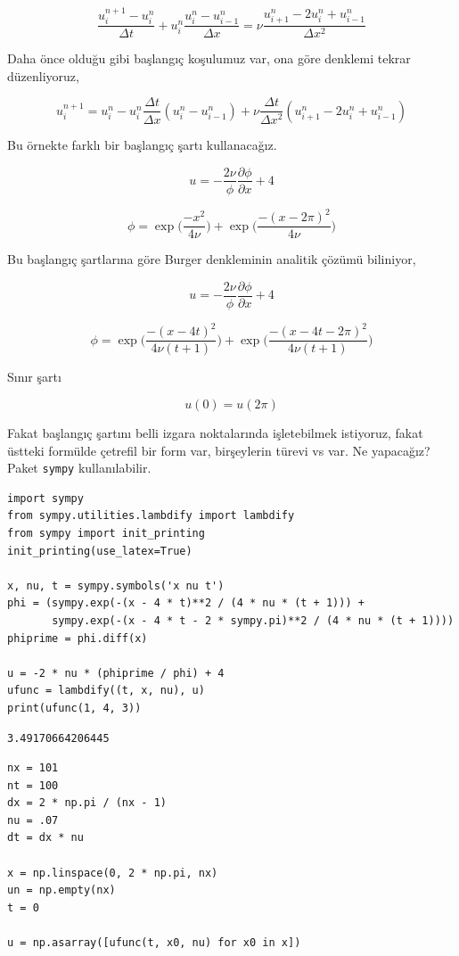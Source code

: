 \documentclass[12pt,fleqn]{article}\usepackage{../../common}
\begin{document}
$$
\frac{u_i^{n+1}-u_i^n}{\Delta t} + u_i^n \frac{u_i^n - u_{i-1}^n}{\Delta x} =
\nu \frac{u_{i+1}^n - 2u_i^n + u_{i-1}^n}{\Delta x^2}
$$

Daha önce olduğu gibi başlangıç koşulumuz var, ona göre denklemi tekrar
düzenliyoruz,

$$
u_i^{n+1} =
u_i^n - u_i^n \frac{\Delta t}{\Delta x} (u_i^n - u_{i-1}^n) +
\nu \frac{\Delta t}{\Delta x^2}(u_{i+1}^n - 2u_i^n + u_{i-1}^n)
$$

Bu örnekte farklı bir başlangıç şartı kullanacağız.

$$
u = -\frac{2 \nu}{\phi} \frac{\partial \phi}{\partial x} + 4 
$$

$$
\phi = \exp \bigg(\frac{-x^2}{4 \nu} \bigg) + \exp \bigg(\frac{-(x-2 \pi)^2}{4 \nu} \bigg)
$$

Bu başlangıç şartlarına göre Burger denkleminin analitik çözümü biliniyor,

$$
u = -\frac{2 \nu}{\phi} \frac{\partial \phi}{\partial x} + 4
$$

$$
\phi = \exp \bigg(\frac{-(x-4t)^2}{4 \nu (t+1)} \bigg) + \exp \bigg(\frac{-(x-4t -2 \pi)^2}{4 \nu(t+1)} \bigg)
$$

Sınır şartı

$$
u(0) = u(2\pi)
$$

Fakat başlangıç şartını belli izgara noktalarında işletebilmek istiyoruz, fakat
üstteki formülde çetrefil bir form var, birşeylerin türevi vs var. Ne yapacağız? 
Paket \verb!sympy! kullanılabilir.

\begin{verbatim}
import sympy
from sympy.utilities.lambdify import lambdify
from sympy import init_printing
init_printing(use_latex=True)

x, nu, t = sympy.symbols('x nu t')
phi = (sympy.exp(-(x - 4 * t)**2 / (4 * nu * (t + 1))) +
       sympy.exp(-(x - 4 * t - 2 * sympy.pi)**2 / (4 * nu * (t + 1))))
phiprime = phi.diff(x)

u = -2 * nu * (phiprime / phi) + 4
ufunc = lambdify((t, x, nu), u)
print(ufunc(1, 4, 3))
\end{verbatim}

\begin{verbatim}
3.49170664206445
\end{verbatim}


\begin{verbatim}
nx = 101
nt = 100
dx = 2 * np.pi / (nx - 1)
nu = .07
dt = dx * nu

x = np.linspace(0, 2 * np.pi, nx)
un = np.empty(nx)
t = 0

u = np.asarray([ufunc(t, x0, nu) for x0 in x])
\end{verbatim}
\end{document}
